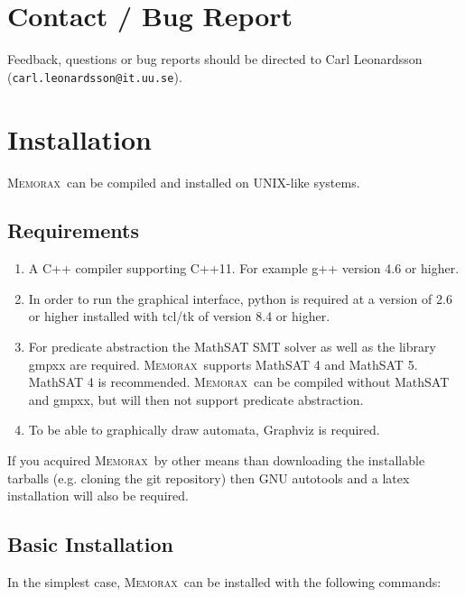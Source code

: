 \documentclass[a4paper]{article}
\newcommand{\memorax}{\textsc{Memorax}}
\begin{document}
\section{Contact / Bug Report}

Feedback, questions or bug reports should be directed to Carl
Leonardsson ({\tt carl.leonardsson@it.uu.se}).

\section{Installation}

\memorax\ can be compiled and installed on UNIX-like systems.

\subsection{Requirements}

\begin{enumerate}

  \item A C++ compiler supporting C++11. For example g++ version 4.6 or
     higher.

  \item In order to run the graphical interface, python is required at a
     version of 2.6 or higher installed with tcl/tk of version 8.4 or
     higher.

  \item For predicate abstraction the MathSAT SMT solver as well as the
     library gmpxx are required. \memorax\ supports MathSAT 4 and
     MathSAT 5. MathSAT 4 is recommended. \memorax\ can be compiled without
     MathSAT and gmpxx, but will then not support predicate
     abstraction.

  \item To be able to graphically draw automata, Graphviz is required.
\end{enumerate}

If you acquired \memorax\ by other means than downloading the
installable tarballs (e.g. cloning the git repository) then GNU
autotools and a latex installation will also be required.

\subsection{Basic Installation}

   In the simplest case, \memorax\ can be installed with the following
   commands:
\end{document}
